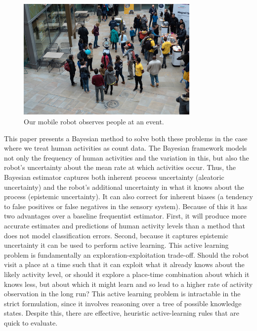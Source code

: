 \begin{figure}[t!]
	\centering

	\includegraphics[width=0.79\textwidth]{./figures/robot_in_human_environment.jpeg}
	\caption{Our mobile robot observes people at an event.} 
	\label{fig:robot_in_human_environment}
\end{figure}
This paper presents a Bayesian method to solve both these problems in the case where we treat human activities as count data. %
The Bayesian framework models not only the frequency of human activities and the variation in this, but also the robot's uncertainty about the mean rate at which activities occur. Thus, the Bayesian estimator captures both inherent process uncertainty (aleatoric uncertainty) and the robot's additional uncertainty in what it knows about the process (epistemic uncertainty). It can also correct for inherent biases (a tendency to false positives or false negatives in the sensory system). Because of this it has two advantages over a baseline frequentist estimator. First, it will produce more accurate estimates and predictions of human activity levels than a method that does not model classification errors. Second, because it captures epistemic uncertainty it can be used to perform active learning. This active learning problem is fundamentally an exploration-exploitation trade-off. Should the robot visit a place at a time such that it can exploit what it already knows about the likely activity level, or should it explore a place-time combination about which it knows less, but about which it might learn and so lead to a higher rate of activity observation in the long run? This active learning problem is intractable in the strict formulation, since it involves reasoning over a tree of possible knowledge states. Despite this, there are effective, heuristic active-learning rules that are quick to evaluate. %

